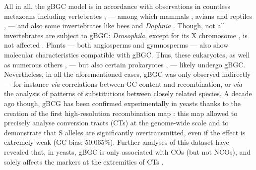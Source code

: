 All in all, the gBGC model is in accordance with observations in countless metazoans \citep{capra2011substitution,galtier2018codon} including vertebrates \citep{figuet2014biased}, — among which mammals \citep{romiguier2010contrasting,katzman2011ongoing,lartillot2013phylogenetic,clement2013meiotic,glemin2015quantification,dutta20181000}, avians \citep{webster2006strong,weber2014evidence,bolivar2016recombination} and reptiles \citep{figuet2014biased}, — and also some invertebrates like bees \citep{kent2012recombination,wallberg2015extreme} and \textit{Daphnia} \citep{keith2016high}.
Though, not all invertebrates are subject to gBGC\@: \textit{Drosophila}, except for its X chromosome \citep{galtier2006gcbiased,haddrill2008nonneutral}, is not affected \citep{robinson2014population}.
Plants — both angiosperms \citep[but see \citealp{liu2018tetrad}]{escobar2011gcbiased, glemin2014gc,rodgers-melnick2016open,clement2017evolutionary,niu2017mutational} and gymnosperms \citep{serres-giardi2012patterns} — also show molecular characteristics compatible with gBGC\@.
Thus, these eukaryotes, as well as numerous others \citep{escobar2011gcbiased,pessia2012evidence}, — but also certain prokaryotes \citep{lassalle2015gccontent,long2018evolutionary}, — likely undergo gBGC\@.\\

%
%
%
%
%
%

Nevertheless, in all the aforementioned cases, gBGC was only observed indirectly — for instance \textit{via} correlations between GC-content and recombination, or \textit{via} the analysis of patterns of substitutions between closely related species. 
A decade ago though, gBCG has been confirmed experimentally in yeasts thanks to the creation of the first high-resolution recombination map \citep{mancera2008highresolution}: this map allowed to precisely analyse conversion tracts (CTs) at the genome-wide scale and to demonstrate that S alleles are significantly overtransmitted, even if the effect is extremely weak (GC-bias: 50.065\%).
Further analyses of this dataset have revealed that, in yeasts, gBGC is only associated with COs (but not NCOs), and solely affects the markers at the extremities of CTs \citep{lesecque2013gcbiased}.

